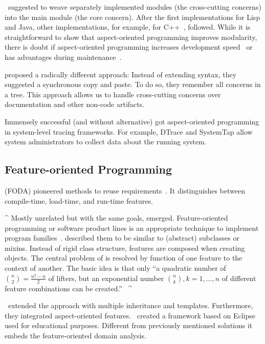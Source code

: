 \citet{kiczales1997aspect}~suggested to weave separately implemented modules (the cross-cutting concerns) into the main module (the core concern).
After the first implementations for Lisp and Java, other implementations, for example, for C++~\cite{apel2005featurec++}, followed.
While it is straightforward to show that aspect-oriented programming improves modularity, there is doubt if aspect-oriented programming increases development speed~\cite{hanenberg2009aspect} or has advantages during maintenance~\cite{endrikat2011aspect}.

\citet{chiba2012we} proposed a radically different approach:
Instead of extending syntax, they suggested a synchronous copy and paste.
To do so, they remember all concerns in a tree.
This approach allows us to handle cross-cutting concerns over documentation and other non-code artifacts.

Immensely successful (and without alternative) got aspect-oriented programming in system-level tracing frameworks.
For example, DTrace and SystemTap allow system administrators to collect data about the running system.

\subsection{Feature-oriented Programming}

 (FODA) pioneered methods to reuse requirements~\cite{kang1990feature}.
It distinguishes between compile-time, load-time, and run-time features.

\lstDeleteShortInline^
Mostly unrelated but with the same goals,  emerged.
Feature-oriented programming or software product lines is an appropriate technique to implement program families~\cite{lee2002concepts,van2001notion,midtgaard2014systematic}.
\citet{prehofer1997feature} described them to be similar to (abstract) subclasses or mixins.
Instead of rigid class structure, features are composed when creating objects.
The central problem of  is resolved by  function of one feature to the context of another.
The basic idea is that only \enquote{a quadratic number of $\binom{n}{2} = \frac{n^2 - n} 2$ of lifters, but an exponential number $\binom{n}{k}, k=1,...,n$ of different feature combinations can be created.}~\cite{prehofer1997feature}
\lstMakeShortInline[postbreak=,keywordstyle={}]^

\citet{apel2005featurec++}~extended the approach with multiple inheritance and templates.
Furthermore, they integrated aspect-oriented features.
\citet{thuem2014featureide}~created a framework based on Eclipse used for educational purposes.
Different from previously mentioned solutions it embeds the feature-oriented domain analysis.

